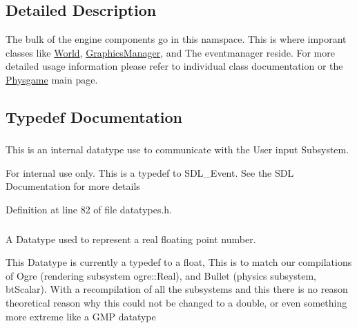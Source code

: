 \subsection{Detailed Description}
The bulk of the engine components go in this namspace. This is where imporant classes like \hyperlink{classphys_1_1World}{World}, \hyperlink{classphys_1_1GraphicsManager}{GraphicsManager}, and The eventmanager reside. For more detailed usage information please refer to individual class documentation or the \hyperlink{index}{Physgame} main page. 

\subsection{Typedef Documentation}
\hypertarget{namespacephys_a8126d26e4507e66d09876988bb941fd4}{
\subsubsection[{RawEvent}]{}}
\label{df/dec/namespacephys_a8126d26e4507e66d09876988bb941fd4}


This is an internal datatype use to communicate with the User input Subsystem. 

\begin{DoxyInternal}{For internal use only.}
This is a typedef to SDL\_\-Event. See the SDL Documentation for more details \end{DoxyInternal}


Definition at line 82 of file datatypes.h.

\hypertarget{namespacephys_af7eb897198d265b8e868f45240230d5f}{
\subsubsection[{Real}]{}}
\label{df/dec/namespacephys_af7eb897198d265b8e868f45240230d5f}


A Datatype used to represent a real floating point number. 

This Datatype is currently a typedef to a float, This is to match our compilations of Ogre (rendering subsystem ogre::Real), and Bullet (physics subsystem, btScalar). With a recompilation of all the subsystems and this there is no reason theoretical reason why this could not be changed to a double, or even something more extreme like a GMP datatype 

